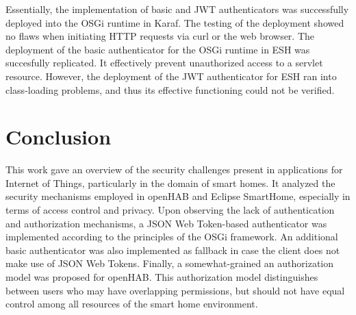 \documentclass[12pt]{article}
\begin{document}
Essentially, the implementation of basic and JWT authenticators was successfully deployed into the OSGi runtime in Karaf. The testing of the deployment showed no flaws when initiating HTTP requests via curl or the web browser. The deployment of the basic authenticator for the OSGi runtime in ESH was succesfully replicated. It effectively prevent unauthorized access to a servlet resource. However, the deployment of the JWT authenticator for ESH ran into class-loading problems, and thus its effective functioning could not be verified. 

\newpage
\section{Conclusion}
\label{sec:conclusion}

This work gave an overview of the security challenges present in applications for Internet of Things, particularly in the domain of smart homes. It analyzed the security mechanisms employed in openHAB and Eclipse SmartHome, especially in terms of access control and privacy. Upon observing the lack of authentication and authorization mechanisms, a JSON Web Token-based authenticator was implemented according to the principles of the OSGi framework. An additional basic authenticator was also implemented as fallback in case the client does not make use of JSON Web Tokens. Finally, a somewhat-grained an authorization model was proposed for openHAB. This authorization model distinguishes between users who may have overlapping permissions, but should not have equal control among all resources of the smart home environment.
\end{document}
